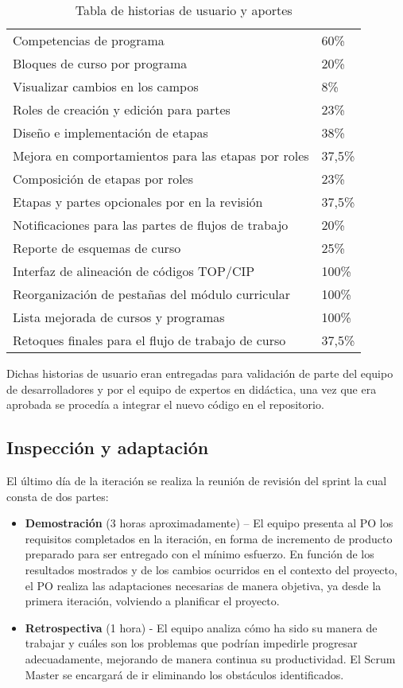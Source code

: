 \begin{table}[H]
\begin{tabular}{@{}ll@{}}
Competencias de programa                            &  60\%  \\
Bloques de curso por programa                       &  20\%  \\
Visualizar cambios en los campos                    &   8\%  \\
Roles de creación y edición para partes             &  23\%  \\
Diseño e implementación de etapas                   &  38\%  \\
Mejora en comportamientos para las etapas por roles & 37,5\% \\
Composición de etapas por roles                     &  23\%  \\
Etapas y partes opcionales por en la revisión       & 37,5\% \\
Notificaciones para las partes de flujos de trabajo &  20\%  \\
Reporte de esquemas de curso                        &  25\%  \\
Interfaz de alineación de códigos TOP/CIP           & 100\%  \\
Reorganización de pestañas del módulo curricular    & 100\%  \\
Lista mejorada de cursos y programas                & 100\%  \\
Retoques finales para el flujo de trabajo de curso  & 37,5\% \\ \bottomrule
\end{tabular}
\caption{Tabla de historias de usuario y aportes}
\label{mis-aportes}
\end{table}

Dichas historias de usuario eran entregadas para validación de parte del equipo de desarrolladores y por el equipo de expertos en didáctica, una vez que era aprobada se procedía a integrar el nuevo código en el repositorio.

\subsection{Inspección y adaptación}
El último día de la iteración se realiza la reunión de revisión del sprint la cual consta de dos partes:
\begin{itemize}
    \item \textbf{Demostración} (3 horas aproximadamente) – El equipo presenta al PO los requisitos completados en la iteración, en forma de incremento de producto preparado para ser entregado con el mínimo esfuerzo. En función de los resultados mostrados y de los cambios ocurridos en el contexto del proyecto, el PO realiza las adaptaciones necesarias de manera objetiva, ya desde la primera iteración, volviendo a planificar el proyecto.
    \item \textbf{Retrospectiva} (1 hora) - El equipo analiza cómo ha sido su manera de trabajar y cuáles son los problemas que podrían impedirle progresar adecuadamente, mejorando de manera continua su productividad. El Scrum Master se encargará de ir eliminando los obstáculos identificados.
\end{itemize}